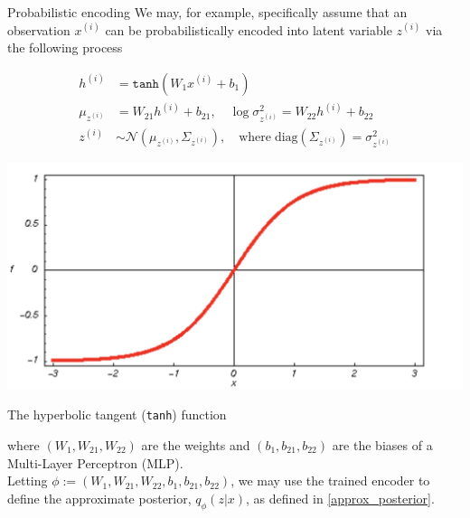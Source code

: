 \documentclass[10pt]{beamer}
\newcommand{\obs}{x^{(i)} }
\newcommand{\alatent}{z^{(i)} }
\newcommand{\N}{\mathcal{N}}
\begin{document}
\begin{frame}{Probabilistic encoding}
\footnotesize
We may, for example, specifically assume that an observation $\obs$ can be probabilistically encoded into latent variable $\alatent$ via the following process

\begin{minipage}{.6\textwidth}
\begin{align*}
h^{(i)} &= \texttt{tanh} (W_1 x^{(i)} + b_1) \\
\mu_{\alatent}&= W_{21} h^{(i)} + b_{21}, \quad \log \sigma^2_{\alatent} = W_{22}h^{(i)}+b_{22} \\
\alatent & \sim \N(\mu_{\alatent}, \Sigma_{\alatent}), \quad \text{where} \; \text{diag}(\Sigma_{\alatent}) = \sigma_{\alatent}^2
\end{align*}
\end{minipage}
\hfill
\begin{minipage}{.3\textwidth}
\begin{center}
\includegraphics[width=.6\textwidth]{images/tanh}

The hyperbolic tangent (\texttt{tanh}) function
\end{center}
\end{minipage}

where $(W_1, W_{21}, W_{22})$ are the weights and $(b_1, b_{21}, b_{22})$ are the biases of a Multi-Layer Perceptron (MLP). \\
\vfill
Letting $\phi := (W_1, W_{21}, W_{22}, b_1, b_{21}, b_{22})$, we may use the trained encoder to define the approximate posterior, $q_\phi(z| x)$, as defined in \eqref{approx_posterior}.
\end{frame}
\end{document}

